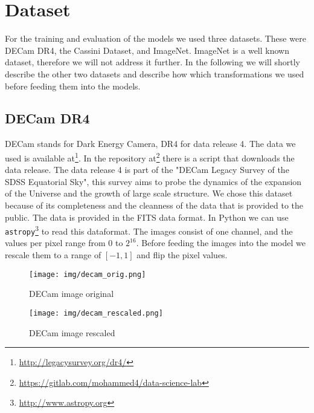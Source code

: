 \section{Dataset}

For the training and evaluation of the models we used three datasets.
%
These were DECam DR4, the Cassini Dataset, and ImageNet.
%
ImageNet is a well known dataset, therefore we will not address it further.
%
In the following we will shortly describe the other two datasets and describe how which transformations we used before feeding them into the models.
%
\subsection{DECam DR4}
%
DECam stands for Dark Energy Camera, DR4 for data release 4.
%
The data we used is available at\footnote{\url{http://legacysurvey.org/dr4/}}.
%
In the repository at\footnote{\url{https://gitlab.com/mohammed4/data-science-lab}} there is a script that downloads the data release.
%
The data release 4  is part of the "DECam Legacy Survey of the SDSS Equatorial Sky", this survey aims to probe the dynamics of the expansion of the Universe and the growth of large scale structure.
%
We chose this dataset because of its completeness and the cleanness of the data that is provided to the public.
%
The data is provided in the FITS data format.
%
In Python we can use \texttt{astropy}\footnote{\url{http://www.astropy.org}} to read this dataformat.
%
The images consist of one channel, and the values per pixel range from $0$ to $2^{16}$.
%
Before feeding the images into the model we rescale them to a range of $[-1, 1]$ and flip the pixel values.
%
%
\begin{figure}[H]
	\centering
	\begin{minipage}{0.45\textwidth}
		\centering
		\texttt{[image: img/decam\_orig.png]}
    	\caption{DECam image original}
	\end{minipage}\hfill
	\begin{minipage}{0.45\textwidth}
		\centering
		\texttt{[image: img/decam\_rescaled.png]}
    	\caption{DECam image rescaled}
	\end{minipage}
\end{figure}
%
